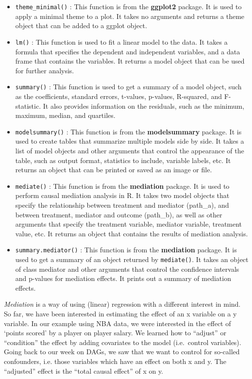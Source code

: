 \documentclass[
]{book}
\begin{document}
\begin{itemize}
\item
  \texttt{theme\_minimal()} : This function is from the \textbf{ggplot2} package. It is used to apply a minimal theme to a plot. It takes no arguments and returns a theme object that can be added to a ggplot object.
\item
  \texttt{lm()} : This function is used to fit a linear model to the data. It takes a formula that specifies the dependent and independent variables, and a data frame that contains the variables. It returns a model object that can be used for further analysis.
\item
  \texttt{summary()} : This function is used to get a summary of a model object, such as the coefficients, standard errors, t-values, p-values, R-squared, and F-statistic. It also provides information on the residuals, such as the minimum, maximum, median, and quartiles.
\item
  \texttt{modelsummary()} : This function is from the \textbf{modelsummary} package. It is used to create tables that summarize multiple models side by side. It takes a list of model objects and other arguments that control the appearance of the table, such as output format, statistics to include, variable labels, etc. It returns an object that can be printed or saved as an image or file.
\item
  \texttt{mediate()} : This function is from the \textbf{mediation} package. It is used to perform causal mediation analysis in R. It takes two model objects that specify the relationship between treatment and mediator (path\_a), and between treatment, mediator and outcome (path\_b), as well as other arguments that specify the treatment variable, mediator variable, treatment value, etc. It returns an object that contains the results of mediation analysis.
\item
  \texttt{summary.mediator()} : This function is from the \textbf{mediation} package. It is used to get a summary of an object returned by \texttt{mediate()}. It takes an object of class mediator and other arguments that control the confidence intervals and p-values for mediation effects. It prints out a summary of mediation effects.
\end{itemize}

\emph{Mediation} is a way of using (linear) regression with a different interest in mind.
So far, we have been interested in estimating the effect of an x variable on a
y variable. In our example using NBA data, we were interested in the effect of
`points scored' by a player on player salary. We learned how to ``adjust'' or ``condition''
the effect by adding covariates to the model (i.e.~control variables). Going back to
our week on DAGs, we saw that we want to control for so-called confounders, i.e.
those variables which have an effect on both x and y. The ``adjusted'' effect is the
``total causal effect'' of x on y.
\end{document}
